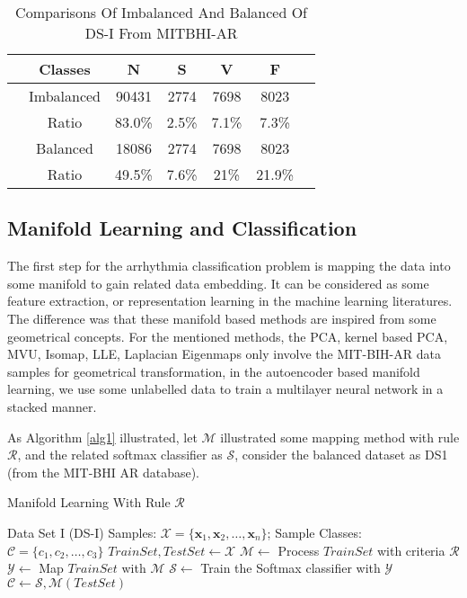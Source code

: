 \documentclass[journal]{IEEEtran}
\begin{document}
\begin{table}[!htbp]
\begin{center}
\begin{threeparttable}
\caption{Comparisons Of Imbalanced And Balanced Of DS-I From MITBHI-AR}
\label{distriofData}
\begin{tabular}{ccccccc}
\hline
& Classes & N & S & V  & F \\
\hline
& Imbalanced  &90431  & 2774  & 7698   &8023\\
& Ratio & 83.0\%&  2.5\%& 7.1\%  & 7.3\% \\
\hline
& Balanced  & 18086 & 2774  & 7698 & 8023         \\
& Ratio & 49.5\%&  7.6\%& 21\%  & 21.9\% \\
\hline
\end{tabular}
\end{threeparttable}
\end{center}
\end{table}
     

%
%                
%
     
     
\subsection{Manifold Learning and Classification}
The first step for the arrhythmia classification problem is mapping the data into some manifold to gain related data embedding. It can be considered as some feature extraction, or representation learning in the machine learning literatures.
The difference was that these manifold based methods are inspired from some geometrical concepts.
For the mentioned methods, the PCA, kernel based PCA, MVU, Isomap, LLE, Laplacian Eigenmaps only involve the MIT-BIH-AR data samples for geometrical transformation, in the autoencoder based manifold learning, we use some unlabelled data to train a multilayer neural network in a stacked manner.

As Algorithm \ref{alg1} illustrated, let $\mathcal{M}$ illustrated some mapping method with rule $\mathcal{R}$, and the related softmax classifier as $\mathcal{S}$, consider the balanced dataset as DS1 (from the MIT-BHI AR database). 

\begin{algorithm}
 \caption{Manifold Learning With Rule $\mathcal{R}$}
 \label{alg1}
 \begin{algorithmic}
 \REQUIRE Data Set I (DS-I) Samples: $ \mathcal{X} = \{\bm{x}_1, \bm{x}_2, \ldots, \bm{x}_n\}$;
 \ENSURE Sample Classes: $\mathcal{C} = \{c_1, c_2, \ldots, c_3\}$
 \STATE $TrainSet, TestSet \leftarrow \mathcal{X}$
 \STATE $\mathcal{M} \leftarrow $ Process $TrainSet$ with criteria $\mathcal{R}$
 \STATE $\mathcal{Y} \leftarrow$ Map $TrainSet$ with $\mathcal{M}$ 
 \STATE $\mathcal{S} \leftarrow$ Train the Softmax classifier with $\mathcal{Y}$
 \STATE $\mathcal{C} \leftarrow \mathcal{S}, \mathcal{M}(TestSet)$
  \end{algorithmic}
 \end{algorithm}
\end{document}
